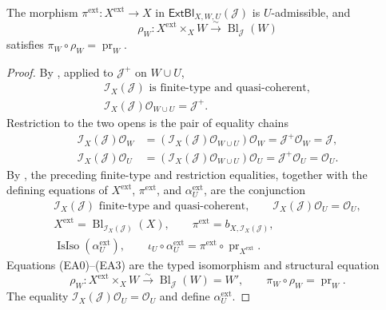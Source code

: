 \begin{lemma}
  \label{lemma:nagata-extend-admissible-blowup}
  \lean{}

  The morphism
  $\pi^{\mathrm{ext}}\colon X^{\mathrm{ext}}\to X$ in
  $\mathsf{ExtBl}_{X,W,U}(\mathcal J)$ is $U$-admissible, and
  \[
    \rho_W\colon X^{\mathrm{ext}}\times_XW
      \xrightarrow{\sim}\operatorname{Bl}_{\mathcal J}(W)
  \]
  satisfies $\pi_W\circ\rho_W=\operatorname{pr}_W$.
\end{lemma}

\begin{proof}
  By , applied to
  $\mathcal J^+$ on $W\cup U$,
  \[
  \begin{gathered}
    \mathcal I_X(\mathcal J)
      \text{ is finite-type and quasi-coherent},\\
    \mathcal I_X(\mathcal J)\mathcal O_{W\cup U}=\mathcal J^+.
  \end{gathered}
  \]
  Restriction to the two opens is the pair of equality chains
  \[
  \begin{aligned}
    \mathcal I_X(\mathcal J)\mathcal O_W
      &=(\mathcal I_X(\mathcal J)\mathcal O_{W\cup U})\mathcal O_W
       =\mathcal J^+\mathcal O_W=\mathcal J,\\
    \mathcal I_X(\mathcal J)\mathcal O_U
      &=(\mathcal I_X(\mathcal J)\mathcal O_{W\cup U})\mathcal O_U
       =\mathcal J^+\mathcal O_U=\mathcal O_U.
  \end{aligned}
  \]
  By , the preceding finite-type and
  restriction equalities, together with the defining equations of
  $X^{\mathrm{ext}}$, $\pi^{\mathrm{ext}}$, and
  $\alpha_U^{\mathrm{ext}}$, are the conjunction
  \[
  \begin{gathered}
    \mathcal I_X(\mathcal J)\text{ finite-type and quasi-coherent},\qquad
    \mathcal I_X(\mathcal J)\mathcal O_U=\mathcal O_U,\\
    X^{\mathrm{ext}}
      =\operatorname{Bl}_{\mathcal I_X(\mathcal J)}(X),\qquad
    \pi^{\mathrm{ext}}=b_{X,\mathcal I_X(\mathcal J)},\\
    \operatorname{IsIso}(\alpha_U^{\mathrm{ext}}),\qquad
    \iota_U\circ\alpha_U^{\mathrm{ext}}
      =\pi^{\mathrm{ext}}\circ\operatorname{pr}_{X^{\mathrm{ext}}}.
  \end{gathered}
  \]
  Equations (EA0)--(EA3) are the
  typed isomorphism and structural equation
  \[
    \rho_W\colon
      X^{\mathrm{ext}}\times_XW
        \xrightarrow{\sim}\operatorname{Bl}_{\mathcal J}(W)=W',
    \qquad
    \pi_W\circ\rho_W=\operatorname{pr}_W.
  \]
  The equality
  $\mathcal I_X(\mathcal J)\mathcal O_U=\mathcal O_U$ and
   define
  $\alpha_U^{\mathrm{ext}}$.
\end{proof}


